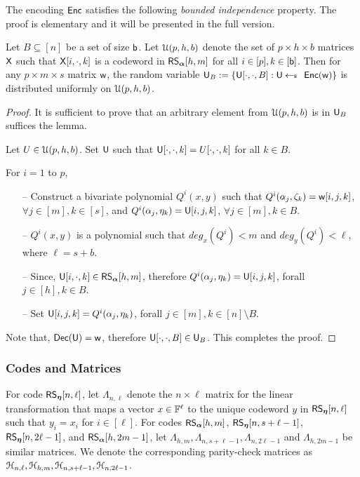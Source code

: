 The encoding $\enc$ satisfies the following {\em bounded independence} property. The proof is elementary and it will be presented in the full version.%
\begin{lemma}\label{lem:boundedindependence}
	Let $B\subseteq [n]$ be a set of size $\bi$. Let $\mc{U}(p,h,b)$ denote the set of $p\times h\times b$ matrices $\matx$ such that $\matx[i,\cdot,k]$ is a codeword in $\rsc{\alpha}{h,m}$ for all $i\in [p],k\in [\bi]$. Then for any $p\times m\times s$ matrix $\wit$, the random variable $\ewit_B := \{\ewit[\cdot,\cdot,B]: \ewit\sample \enc(\wit)\}$ is distributed uniformly on $\mc{U}(p,h,b)$.
\end{lemma}

\begin{proof}
	It is sufficient to prove that an arbitrary element from $\mc{U}(p,h,b)$ is in $\ewit_B$ suffices the lemma.
	
	Let $U\in\mc{U}(p,h,b)$. Set $\ewit$ such that $\ewit[\cdot, \cdot, k] = U[\cdot, \cdot, k]$ for all $k\in B$.
	
	For $i=1$ to $p$,
	\begin{itemize}
		\item[--] Construct a bivariate polynomial $Q^i(x,y)$ such that $Q^i(\alpha_j, \zeta_k) = \wit[i,j,k]$, $\forall j\in[m], k\in[s]$, and $Q^i(\alpha_j, \eta_k) = \ewit[i,j,k]$, $\forall j\in[m], k\in B$. 
		\item[--] $Q^i(x,y)$ is a polynomial such that $deg_x(Q^i) < m$ and $deg_y(Q^i) < \ell$, where $\ell = s + b$.
		\item[--] Since, $\ewit[i,\cdot,k] \in \rsc{\alpha}{h,m}$, therefore $Q^i(\alpha_j,\eta_k) = \ewit[i,j,k]$, forall $j\in[h], k\in B$.
		\item[--] Set $\ewit[i,j,k] = Q^i(\alpha_j, \eta_k)$, forall $j\in[m], k\in [n]\setminus B$. 
	\end{itemize}
	Note that, $\dec(\ewit) = \wit$, therefore $\ewit[\cdot, \cdot, B]\in \ewit_B$.
	This completes the proof.
\end{proof}

\subsubsection{Codes and Matrices}\label{subsec:codesandmatrices}
For code $\rsc{\eta}{n,\ell}$, let $\Lambda_{n,\ell}$ denote the $n\times \ell$ matrix for the linear transformation that maps a vector $x\in \FF^\ell$ to the unique codeword $y$ in  $\rsc{\eta}{n,\ell}$ such that $y_i=x_i$ for $i\in [\ell]$. For codes  $\rsc{\alpha}{h,m}$, $\rsc{\eta}{n,s+\ell-1}$, $\rsc{\eta}{n,2\ell-1}$, and $\rsc{\alpha}{h,2m-1}$, let
$\Lambda_{h,m},\Lambda_{n,s+\ell-1},\Lambda_{n,2\ell-1}$ and $\Lambda_{h,2m-1}$ be similar matrices. We denote the corresponding parity-check matrices as $\mc{H}_{n,\ell},\mc{H}_{h,m},\mc{H}_{n,s+\ell-1},\mc{H}_{n,2\ell-1}$. 

